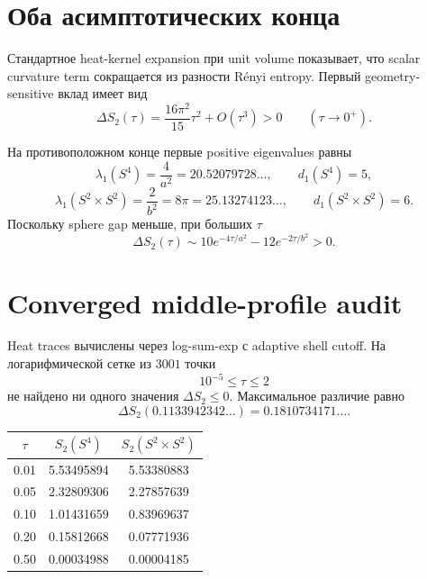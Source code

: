 \section{Оба асимптотических конца}

Стандартное heat-kernel expansion при unit volume показывает, что scalar
curvature term сокращается из разности Rényi entropy. Первый
geometry-sensitive вклад имеет вид
\begin{equation}
 \Delta S_2(\tau)
 =\frac{16\pi^2}{15}\tau^2+O(\tau^3)>0
 \qquad(\tau\to0^+).
 \label{eq:carrier-small-tau-positive}
\end{equation}

На противоположном конце первые positive eigenvalues равны
\begin{equation}
 \lambda_1(S^4)=\frac4{a^2}=20.52079728\ldots,
 \qquad d_1(S^4)=5,
\end{equation}
\begin{equation}
 \lambda_1(S^2\times S^2)=\frac2{b^2}=8\pi
 =25.13274123\ldots,
 \qquad d_1(S^2\times S^2)=6.
\end{equation}
Поскольку sphere gap меньше, при больших \(\tau\)
\begin{equation}
 \Delta S_2(\tau)
 \sim10e^{-4\tau/a^2}-12e^{-2\tau/b^2}>0.
 \label{eq:carrier-large-tau-positive}
\end{equation}

\section{Converged middle-profile audit}

Heat traces вычислены через log-sum-exp с adaptive shell cutoff. На
логарифмической сетке из \(3001\) точки
\begin{equation}
 10^{-5}\le\tau\le2
\end{equation}
не найдено ни одного значения \(\Delta S_2\le0\). Максимальное различие
равно
\begin{equation}
 \Delta S_2(0.1133942342\ldots)
 =0.1810734171\ldots.
\end{equation}

\begin{center}
\begin{tabular}{ccc}
\toprule
\(\tau\) & \(S_2(S^4)\) & \(S_2(S^2\times S^2)\) \\
\midrule
0.01 & 5.53495894 & 5.53380883 \\
0.05 & 2.32809306 & 2.27857639 \\
0.10 & 1.01431659 & 0.83969637 \\
0.20 & 0.15812668 & 0.07771936 \\
0.50 & 0.00034988 & 0.00004185 \\
\bottomrule
\end{tabular}
\end{center}

